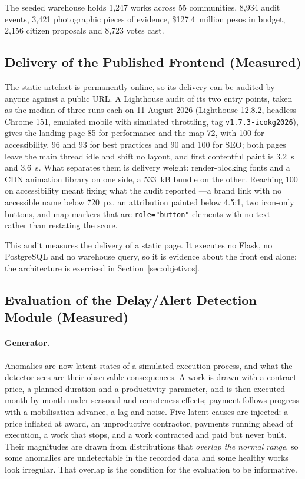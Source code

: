 \documentclass[runningheads]{llncs}
\renewcommand{\_}{\origunderscore\allowbreak}
\begin{document}
The seeded warehouse holds 1,247 works across 55 communities, 8,934 audit events, 3,421
photographic pieces of evidence, \$127.4~million pesos in budget, 2,156 citizen
proposals and 8,723 votes cast.

\subsection{Delivery of the Published Frontend (Measured)}
\label{sec:lighthouse}

The static artefact is permanently online, so its delivery can be audited by
anyone against a public URL. A Lighthouse audit of its two entry points, taken
as the median of three runs each on 11 August 2026 (Lighthouse 12.8.2, headless
Chrome 151, emulated mobile with simulated throttling, tag
\texttt{v1.7.3-icokg2026}), gives the landing page 85 for performance and the
map 72, with 100 for accessibility, 96 and 93 for best practices and 90 and 100
for SEO; both pages leave the main thread idle and shift no layout, and first
contentful paint is 3.2~s and 3.6~s. What separates them is delivery weight:
render-blocking fonts and a CDN animation library on one side, a 533~kB bundle
on the other. Reaching 100 on accessibility meant fixing what the audit
reported ---a brand link with no accessible name below 720~px, an attribution
painted below 4.5:1, two icon-only buttons, and map markers that are
\texttt{role="button"} elements with no text--- rather than restating the
score.

This audit measures the delivery of a static page. It executes no Flask, no
PostgreSQL and no warehouse query, so it is evidence about the front end alone;
the architecture is exercised in Section~\ref{sec:objetivos}.


\subsection{Evaluation of the Delay/Alert Detection Module (Measured)}
\label{sec:eval-deteccion}

\paragraph{Generator.} Anomalies are now latent states of a simulated execution
process, and what the detector sees are their observable consequences. A work
is drawn with a contract price, a planned duration and a productivity
parameter, and is then executed month by month under seasonal and remoteness
effects; payment follows progress with a mobilisation advance, a lag and noise.
Five latent causes are injected: a price inflated at award, an unproductive
contractor, payments running ahead of execution, a work that stops, and a work
contracted and paid but never built. Their magnitudes are drawn from
distributions that \emph{overlap the normal range}, so some anomalies are
undetectable in the recorded data and some healthy works look irregular. That
overlap is the condition for the evaluation to be informative.
\end{document}
